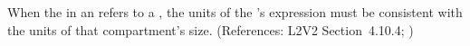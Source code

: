 When the  in an \InitialAssignment refers to a
\Compartment, the units of the \InitialAssignment's  expression
must be consistent with the units of that compartment's size.  (References:
L2V2 Section~4.10.4; )
